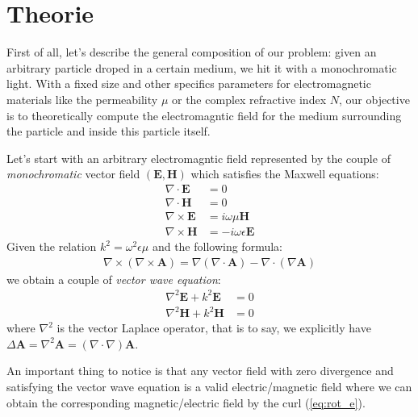 \documentclass{article}
\begin{document}
\newpage

\section{Theorie}

First of all, let's describe the general composition of our problem: given an arbitrary particle droped in a certain medium, we hit it with a monochromatic light. With a fixed size and other specifics parameters for electromagnetic materials like the permeability $\mu$ or the complex refractive index $N$, our objective is to theoretically compute the electromagntic field for the medium surrounding the particle and inside this particle itself.

Let's start with an arbitrary electromagntic field represented by the couple of \textit{monochromatic} vector field $(\textbf{E}, \textbf{H})$ which satisfies the Maxwell equations:
\begin{align}
\nabla \cdot \textbf{E} &= 0\\
\nabla \cdot \textbf{H} &= 0\\
\nabla \times \textbf{E} &= i\omega \mu \textbf{H} \label{eq:rot_e} \\
\nabla \times \textbf{H} &= -i\omega \epsilon \textbf{E}
\end{align}
Given the relation $k^{2} = \omega ^{2}\epsilon \mu$ and the following formula:
\begin{align}\label{eq:rot_rot_a}
\nabla \times (\nabla \times \textbf{A}) = \nabla (\nabla \cdot \textbf{A}) - \nabla \cdot (\nabla \textbf{A})
\end{align}
we obtain a couple of \textit{vector wave equation}:
\begin{align}
\nabla ^{2} \textbf{E} + k^{2}\textbf{E}&=0\\
\nabla ^{2} \textbf{H} + k^{2}\textbf{H}&=0
\end{align}
where $\nabla ^{2}$ is the vector Laplace operator, that is to say, we explicitly have $\Delta \textbf{A} = \nabla ^{2} \textbf{A} = (\nabla \cdot \nabla) \textbf{A}$.

An important thing to notice is that any vector field with zero divergence and satisfying the vector wave equation is a valid electric/magnetic field where we can obtain the corresponding magnetic/electric field by the curl (\ref{eq:rot_e}).
\end{document}

